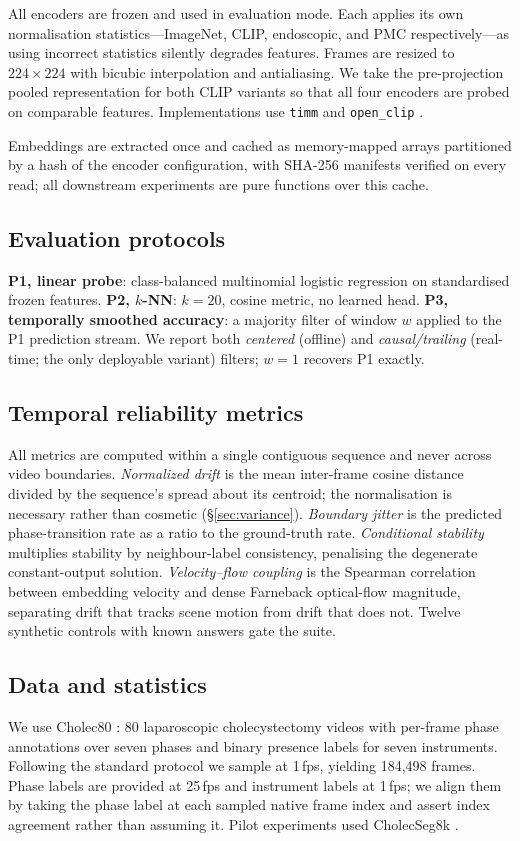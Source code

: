 \documentclass[10pt,twocolumn]{article}
\begin{document}
All encoders are frozen and used in evaluation mode. Each applies its own
normalisation statistics---ImageNet, CLIP, endoscopic, and PMC respectively---as
using incorrect statistics silently degrades features. Frames are resized to
$224\times224$ with bicubic interpolation and antialiasing. We take the
pre-projection pooled representation for both CLIP variants so that all four
encoders are probed on comparable features. Implementations use \texttt{timm}
\citep{wightman2019timm} and \texttt{open\_clip} \citep{ilharco2021openclip}.

Embeddings are extracted once and cached as memory-mapped arrays partitioned by
a hash of the encoder configuration, with SHA-256 manifests verified on every
read; all downstream experiments are pure functions over this cache.

\subsection{Evaluation protocols}
\textbf{P1, linear probe}: class-balanced multinomial logistic regression on
standardised frozen features. \textbf{P2, $k$-NN}: $k=20$, cosine metric, no
learned head. \textbf{P3, temporally smoothed accuracy}: a majority filter of
window $w$ applied to the P1 prediction stream. We report both \emph{centered}
(offline) and \emph{causal/trailing} (real-time; the only deployable variant)
filters; $w=1$ recovers P1 exactly.

\subsection{Temporal reliability metrics}
All metrics are computed within a single contiguous sequence and never across
video boundaries. \emph{Normalized drift} is the mean inter-frame cosine
distance divided by the sequence's spread about its centroid; the normalisation
is necessary rather than cosmetic (\S\ref{sec:variance}). \emph{Boundary
jitter} is the predicted phase-transition rate as a ratio to the ground-truth
rate. \emph{Conditional stability} multiplies stability by neighbour-label
consistency, penalising the degenerate constant-output solution.
\emph{Velocity--flow coupling} is the Spearman correlation between embedding
velocity and dense Farneback optical-flow magnitude, separating drift that
tracks scene motion from drift that does not. Twelve synthetic controls with
known answers gate the suite.

\subsection{Data and statistics}
We use Cholec80 \citep{twinanda2017endonet}: 80 laparoscopic cholecystectomy
videos with per-frame phase annotations over seven phases and binary presence
labels for seven instruments. Following the standard protocol we sample at
1\,fps, yielding 184{,}498 frames. Phase labels are provided at 25\,fps and
instrument labels at 1\,fps; we align them by taking the phase label at each
sampled native frame index and assert index agreement rather than assuming it.
Pilot experiments used CholecSeg8k \citep{hong2020cholecseg8k}.
\end{document}
